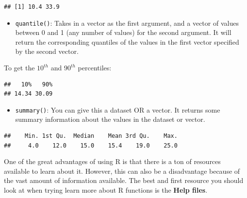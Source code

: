 \documentclass[
]{book}
\newenvironment{Shaded}{\begin{snugshade}}{\end{snugshade}}
\newcommand{\FloatTok}[1]{\textcolor[rgb]{0.00,0.00,0.81}{#1}}
\newcommand{\KeywordTok}[1]{\textcolor[rgb]{0.13,0.29,0.53}{\textbf{#1}}}
\newcommand{\NormalTok}[1]{#1}
\newcommand{\OperatorTok}[1]{\textcolor[rgb]{0.81,0.36,0.00}{\textbf{#1}}}
\providecommand{\tightlist}{%
  \setlength{\itemsep}{0pt}\setlength{\parskip}{0pt}}
\begin{document}
\begin{verbatim}
## [1] 10.4 33.9
\end{verbatim}

\begin{itemize}
\tightlist
\item
  \texttt{quantile()}: Takes in a vector as the first argument, and a vector of values between 0 and 1 (any number of values) for the second argument. It will return the corresponding quantiles of the values in the first vector specified by the second vector.
\end{itemize}

To get the \(10^{th}\) and \(90^{th}\) percentiles:

\begin{Shaded}
\end{Shaded}

\begin{verbatim}
##   10%   90% 
## 14.34 30.09
\end{verbatim}

\begin{itemize}
\tightlist
\item
  \texttt{summary()}: You can give this a dataset OR a vector. It returns some summary information about the values in the dataset or vector.
\end{itemize}

\begin{Shaded}
\end{Shaded}

\begin{verbatim}
##    Min. 1st Qu.  Median    Mean 3rd Qu.    Max. 
##     4.0    12.0    15.0    15.4    19.0    25.0
\end{verbatim}

One of the great advantages of using R is that there is a ton of resources available to learn about it. However, this can also be a disadvantage because of the vast amount of information available. The best and first resource you should look at when trying learn more about R functions is the \textbf{Help files}.
\end{document}

